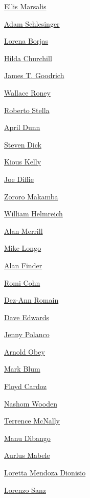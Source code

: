 \protect\hyperlink{ellis-marsalis}{Ellis Marsalis}

\protect\hyperlink{adam-schlesinger}{Adam Schlesinger}

\protect\hyperlink{lorena-borjas}{Lorena Borjas}

\protect\hyperlink{hilda-churchill}{Hilda Churchill}

\protect\hyperlink{james-t-goodrich}{James T. Goodrich}

\protect\hyperlink{wallace-roney}{Wallace Roney}

\protect\hyperlink{roberto-stella}{Roberto Stella}

\protect\hyperlink{april-dunn}{April Dunn}

\protect\hyperlink{steven-dick}{Steven Dick}

\protect\hyperlink{kious-kelly}{Kious Kelly}

\protect\hyperlink{joe-diffie}{Joe Diffie}

\protect\hyperlink{zororo-makamba}{Zororo Makamba}

\protect\hyperlink{william-helmreich}{William Helmreich}

\protect\hyperlink{alan-merrill}{Alan Merrill}

\protect\hyperlink{mike-longo}{Mike Longo}

\protect\hyperlink{alan-finder}{Alan Finder}

\protect\hyperlink{romi-cohn}{Romi Cohn}

\protect\hyperlink{dezann-romain}{Dez-Ann Romain}

\protect\hyperlink{dave-edwards}{Dave Edwards}

\protect\hyperlink{jenny-polanco}{Jenny Polanco}

\protect\hyperlink{arnold-obey}{Arnold Obey}

\protect\hyperlink{mark-blum}{Mark Blum}

\protect\hyperlink{floyd-cardoz}{Floyd Cardoz}

\protect\hyperlink{nashom-wooden}{Nashom Wooden}

\protect\hyperlink{terrence-mcnally}{Terrence McNally}

\protect\hyperlink{manu-dibango}{Manu Dibango}

\protect\hyperlink{aurlus-mabele}{Aurlus Mabele}

\protect\hyperlink{loretta-mendoza-dionisio}{Loretta Mendoza Dionisio}

\protect\hyperlink{lorenzo-sanz}{Lorenzo Sanz}

